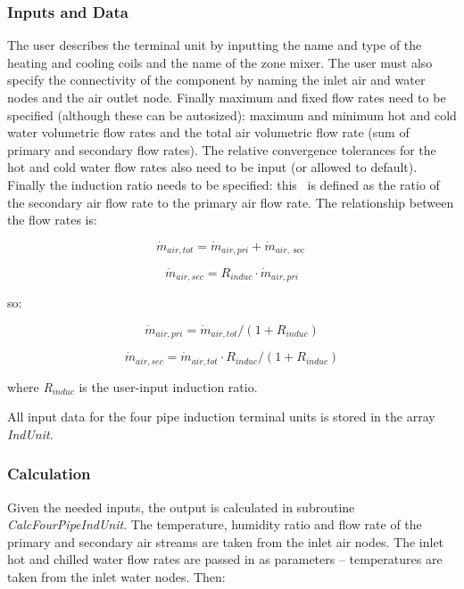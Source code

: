 \subsubsection{Inputs and Data}\label{inputs-and-data}

The user describes the terminal unit by inputting the name and type of the heating and cooling coils and the name of the zone mixer. The user must also specify the connectivity of the component by naming the inlet air and water nodes and the air outlet node. Finally maximum and fixed flow rates need to be specified (although these can be autosized): maximum and minimum hot and cold water volumetric flow rates and the total air volumetric flow rate (sum of primary and secondary flow rates). The relative convergence tolerances for the hot and cold water flow rates also need to be input (or allowed to default). Finally the induction ratio needs to be specified: this~ is defined as the ratio of the secondary air flow rate to the primary air flow rate. The relationship between the flow rates is:

\begin{equation}
{\dot m_{air,tot}} = {\dot m_{air,pri}} + {\dot m_{air,\sec }}
\end{equation}

\begin{equation}
{\dot m_{air,sec}} = {R_{induc}}\cdot {\dot m_{air,pri}}
\end{equation}

so:

\begin{equation}
{\dot m_{air,pri}} = {\dot m_{air,tot}}/(1 + {R_{induc}})
\end{equation}

\begin{equation}
{\dot m_{air,sec}} = {\dot m_{air,tot}}\cdot {R_{induc}}/(1 + {R_{induc}})
\end{equation}

where \emph{R\(_{induc}\)} is the user-input induction ratio.

All input data for the four pipe induction terminal units is stored in the array \emph{IndUnit}.

\subsubsection{Calculation}\label{calculation}

Given the needed inputs, the output is calculated in subroutine \emph{CalcFourPipeIndUnit}. The temperature, humidity ratio and flow rate of the primary and secondary air streams are taken from the inlet air nodes. The inlet hot and chilled water flow rates are passed in as parameters -- temperatures are taken from the inlet water nodes. Then:

